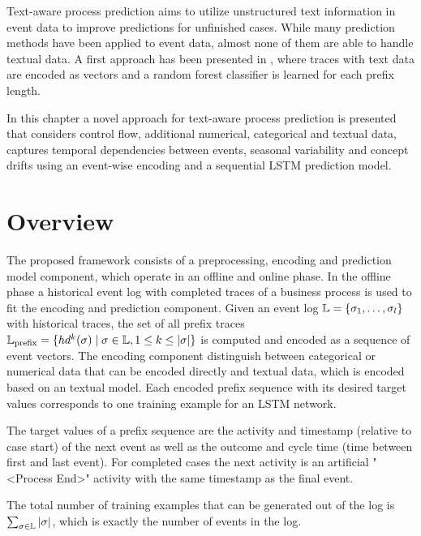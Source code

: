 Text-aware process prediction aims to utilize unstructured text information in event data to improve predictions for unfinished cases.
While many prediction methods have been applied to event data, almost none of them are able to handle textual data.
A first approach has been presented in \cite{DBLP:conf/bpm/TeinemaaDMF16}, where traces with text data are encoded as vectors and a random forest classifier is learned for each prefix length.

In this chapter a novel approach for text-aware process prediction is presented that considers control flow, additional numerical, categorical and textual data, captures temporal dependencies between events, seasonal variability and concept drifts using an event-wise encoding and a sequential LSTM prediction model.

\section{Overview}

The proposed framework consists of a preprocessing, encoding and prediction model component, which operate in an offline and online phase.
In the offline phase a historical event log with completed traces of a business process is used to fit the encoding and prediction component.
Given an event log $\mathbb{L} = \{\sigma_1, \dots, \sigma_l\}$ with historical traces, the set of all prefix traces $\mathbb{L}_\mathrm{prefix} = \{ hd^k(\sigma) \mid  \sigma \in \mathbb{L}, 1 \leq k \leq |\sigma|\}$ is computed and encoded as a sequence of event vectors.
The encoding component distinguish between categorical or numerical data that can be encoded directly and textual data, which is encoded based on an textual model.
Each encoded prefix sequence with its desired target values corresponds to one training example for an LSTM network.

The target values of a prefix sequence are the activity and timestamp (relative to case start) of the next event as well as the outcome and cycle time (time between first and last event).
For completed cases the next activity is an artificial "<Process End>" activity with the same timestamp as the final event.

The total number of training examples that can be generated out of the log is $\sum_{\sigma \in \mathbb{L}}|\sigma|$, which is exactly the number of events in the log.




